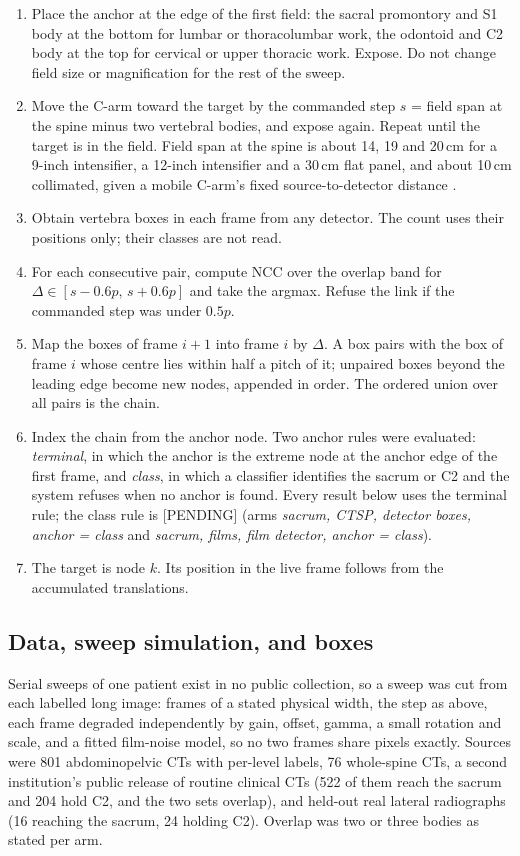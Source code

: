 \documentclass[11pt,letterpaper]{article}
\begin{document}
\begin{enumerate}\setlength\itemsep{1pt}
\item Place the anchor at the edge of the first field: the sacral promontory and S1 body at the bottom for
lumbar or thoracolumbar work, the odontoid and C2 body at the top for cervical or upper thoracic work.
Expose. Do not change field size or magnification for the rest of the sweep.
\item Move the C-arm toward the target by the commanded step $s$ = field span at the spine minus two
vertebral bodies, and expose again. Repeat until the target is in the field. Field span at the spine is
about 14, 19 and 20\,cm for a 9-inch intensifier, a 12-inch intensifier and a 30\,cm flat panel, and about
10\,cm collimated, given a mobile C-arm's fixed source-to-detector distance \citep{naik2022,ge_k170752}.
\item Obtain vertebra boxes in each frame from any detector. The count uses their positions only; their
classes are not read.
\item For each consecutive pair, compute NCC over the overlap band for $\Delta\in[s-0.6p,\,s+0.6p]$ and
take the argmax. Refuse the link if the commanded step was under $0.5p$.
\item Map the boxes of frame $i+1$ into frame $i$ by $\Delta$. A box pairs with the box of frame $i$ whose
centre lies within half a pitch of it; unpaired boxes beyond the leading edge become new nodes, appended in
order. The ordered union over all pairs is the chain.
\item Index the chain from the anchor node. Two anchor rules were evaluated: \emph{terminal}, in which the
anchor is the extreme node at the anchor edge of the first frame, and \emph{class}, in which a classifier
identifies the sacrum or C2 and the system refuses when no anchor is found. Every result below uses the
terminal rule; the class rule is [PENDING] (arms \emph{sacrum, CTSP, detector boxes, anchor = class} and
\emph{sacrum, films, film detector, anchor = class}).
\item The target is node $k$. Its position in the live frame follows from the accumulated translations.
\end{enumerate}

\subsection*{Data, sweep simulation, and boxes}

Serial sweeps of one patient exist in no public collection, so a sweep was cut from each labelled long
image: frames of a stated physical width, the step as above, each frame degraded independently by gain,
offset, gamma, a small rotation and scale, and a fitted film-noise model, so no two frames share pixels
exactly. Sources were 801 abdominopelvic CTs with per-level labels, 76 whole-spine CTs, a second
institution's public release of routine clinical CTs (522 of them reach the sacrum and 204 hold C2, and
the two sets overlap), and held-out real lateral radiographs (16 reaching the sacrum,
24 holding C2). Overlap was two or
three bodies as stated per arm.
\end{document}
